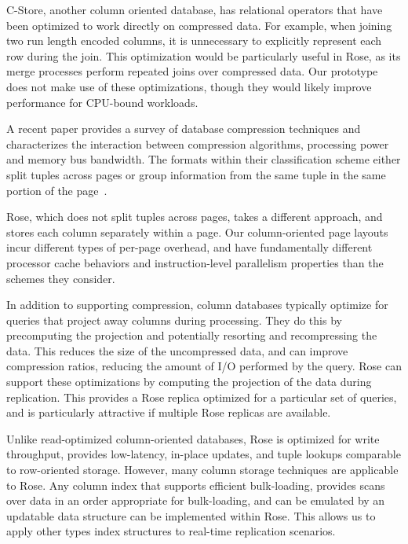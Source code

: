 \documentclass{vldb}
\newcommand{\rows}{Rose\xspace}
\begin{document}
C-Store, another column oriented database, has relational operators
that have been optimized to work directly on compressed
data\cite{compExec}.  For example, when joining two run length encoded
columns, it is unnecessary to explicitly represent each row during the
join.  This optimization would be particularly useful in \rows, as its
merge processes perform repeated joins over compressed data.  Our
prototype does not make use of these optimizations, though they would
likely improve performance for CPU-bound workloads.

A recent paper provides a survey of database compression techniques
and characterizes the interaction between compression algorithms,
processing power and memory bus bandwidth.  The formats within their
classification scheme either split tuples across pages or group
information from the same tuple in the same portion of the
page~\cite{bitsForChronos}.

\rows, which does not split tuples across pages, takes a different
approach, and stores each column separately within a page.  Our
column-oriented page layouts incur different types of per-page overhead, and
have fundamentally different processor
cache behaviors and instruction-level parallelism properties than the
schemes they consider.

In addition to supporting compression, column databases typically
optimize for queries that project away columns during processing.
They do this by precomputing the projection and potentially resorting
and recompressing the data.  This reduces the size of the uncompressed
data, and can improve compression ratios, reducing the amount of I/O
performed by the query.  \rows can support these optimizations by
computing the projection of the data during replication.  This
provides a \rows replica optimized for a particular set of queries,
and is particularly attractive if multiple \rows replicas are
available.

Unlike read-optimized column-oriented databases, \rows is optimized
for write throughput, provides low-latency, in-place updates, and tuple lookups comparable to row-oriented storage.
However, many column storage techniques are applicable to \rows.  Any
column index that supports efficient bulk-loading, provides scans over data in an order appropriate for bulk-loading, and can be emulated by an
updatable data structure can be implemented within
\rows.  This allows us to apply other types index structures
to real-time replication scenarios.

\end{document}

